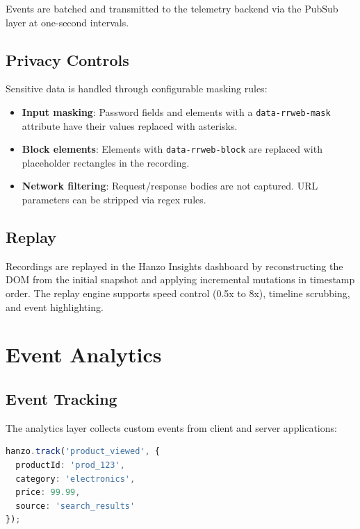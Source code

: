 \documentclass[11pt,a4paper]{article}
\begin{document}
Events are batched and transmitted to the telemetry backend via the PubSub layer at one-second intervals.

\subsection{Privacy Controls}

Sensitive data is handled through configurable masking rules:

\begin{itemize}
    \item \textbf{Input masking}: Password fields and elements with a \texttt{data-rrweb-mask} attribute have their values replaced with asterisks.
    \item \textbf{Block elements}: Elements with \texttt{data-rrweb-block} are replaced with placeholder rectangles in the recording.
    \item \textbf{Network filtering}: Request/response bodies are not captured. URL parameters can be stripped via regex rules.
\end{itemize}

\subsection{Replay}

Recordings are replayed in the Hanzo Insights dashboard by reconstructing the DOM from the initial snapshot and applying incremental mutations in timestamp order. The replay engine supports speed control (0.5x to 8x), timeline scrubbing, and event highlighting.

\section{Event Analytics}

\subsection{Event Tracking}

The analytics layer collects custom events from client and server applications:

\begin{lstlisting}[language=TypeScript,caption=Event tracking API.]
hanzo.track('product_viewed', {
  productId: 'prod_123',
  category: 'electronics',
  price: 99.99,
  source: 'search_results'
});
\end{lstlisting}
\end{document}
